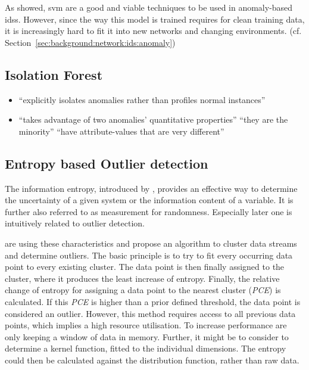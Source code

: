 As \textcite{Eskin2002,Lazarevic2003} showed, \gls{svm} are a good and viable techniques to be used in anomaly-based \glspl{ids}. However, since the way this model is trained requires for clean training data, it is increasingly hard to fit it into new networks and changing environments. (cf. Section~\ref{sec:background:network:ids:anomaly})
	
\subsection{Isolation Forest}
\label{sec:background:network:novelty:isoforest}
	
	\begin{itemize}
		\item \enquote{explicitly isolates anomalies rather than profiles normal instances} \parencite{Liu2008}
		\item \enquote{takes advantage of two anomalies’ quantitative properties} \parencite{Liu2008}
			\subitem \enquote{they are the minority}
			\subitem \enquote{have attribute-values that are very different}
	\end{itemize}

\subsection{Entropy based Outlier detection}
\label{sec:background:network:novelty:entropy}

The information entropy, introduced by \textcite{Shannon1948}, provides an effective way to determine the uncertainty of a given system or the information content of a variable. It is further also referred to as measurement for randomness. Especially later one is intuitively related to outlier detection.

\textcite{Toshniwal2014} are using these characteristics and propose an algorithm to cluster data streams and determine outliers. 
The basic principle is to try to fit every occurring data point to every existing cluster. The data point is then finally assigned to the cluster, where it produces the least increase of entropy. Finally, the relative change of entropy for assigning a data point to the nearest cluster (\emph{PCE}) is calculated. If this \emph{PCE} is higher than a prior defined threshold, the data point is considered an outlier.
However, this method requires access to all previous data points, which implies a high resource utilisation. To increase performance \textcite{Toshniwal2014} are only keeping a window of data in memory.
Further, it might be to consider to determine a kernel function, fitted to the individual dimensions. The entropy could then be calculated against the distribution function, rather than raw data.



